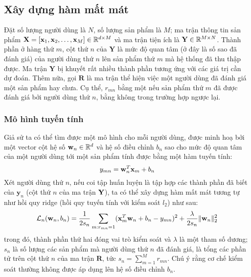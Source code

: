 \subsection{Xây dựng hàm mất mát}

Đặt số lượng người dùng là $N$, số lượng sản phẩm là $M$; ma
trận thông tin sản phẩm $\mathbf{X} = [\mathbf{x}_1, \mathbf{x}_2, \dots, \mathbf{x}_M] \in\mathbb{R}^{d\times M}$ và ma
trận tiện ích là $\mathbf{Y} \in \mathbb{R}^{M \times N}$. Thành phần ở hàng thứ $m$, cột
thứ $n$ của $\mathbf{Y}$ là {mức độ quan tâm} (ở đây là số sao đã
đánh giá) của người dùng thứ $n$ lên sản phẩm thứ $m$ mà hệ thống
đã thu
thập được. Ma trận $\mathbf{Y}$ bị khuyết rất nhiều thành phần tương ứng với các
giá trị cần dự đoán. Thêm nữa, gọi $\mathbf{R}$ là ma trận thể hiện việc một người dùng đã đánh giá một
sản phẩm hay chưa. Cụ thể, $r_{mn}$ bằng một nếu sản phẩm thứ $m$ đã
được đánh giá bởi người dùng thứ $n$, bằng không trong trường hợp ngược
lại.

\subsubsection{Mô hình tuyến tính}

Giả sử ta có thể tìm được một mô hình cho mỗi người dùng, được minh hoạ
bởi một vector cột hệ số $\mathbf{w}_n \in \mathbb{R}^d$ và hệ số điều chỉnh $b_n$ sao cho
{mức độ quan tâm} của một người dùng tới một sản phẩm tính
được bằng một hàm tuyến tính:
\begin{equation}
\label{eqn:23_1}
y_{mn} = \mathbf{w}_n^T\mathbf{x}_m + b_n
\end{equation}
Xét người dùng thứ $n$, nếu coi tập huấn luyện là tập hợp các
thành phần đã biết của $\mathbf{y}_n$ (cột thứ $n$ của ma
trận $\mathbf{Y}$), ta có thể xây dựng hàm mất
mát tương tự như hồi quy {ridge} (hồi quy tuyến tính với kiểm soát $l_2$) như sau:
\begin{equation}
\label{eqn:23_1}
\mathcal{L}_n(\mathbf{w}_n, b_n) = \frac{1}{2s_n} \sum_{m:r_{mn} = 1}(\mathbf{x}_m^T\mathbf{w}_n +
b_n
- y_{mn})^2
+ \frac{\lambda}{2s_n} \|\mathbf{w}_n\|_2^2
\end{equation}
trong đó, thành phần thứ hai đóng vai trò kiểm soát và $\lambda$ là một tham số
dương; $s_n$ là số lượng các sản phẩm mà người dùng thứ $n$ đã đánh giá,
là tổng các phần tử trên cột thứ $n$ của ma trận $\mathbf{R}$, tức $s_n =
\sum_{m=1}^M r_{mn}$. Chú ý rằng cơ chế kiểm soát thường không được áp dụng lên
hệ số điều chỉnh $b_n$.



